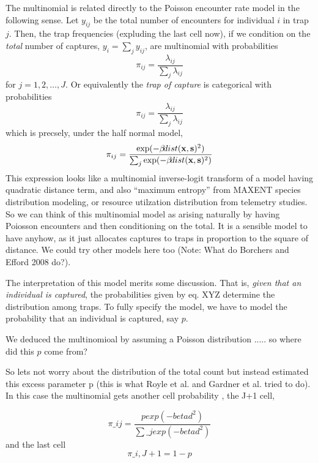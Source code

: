{The multinomial is related
directly to the Poisson encounter rate model in the 
following sense. Let $y_{ij}$ be the total number of encounters for
individual $i$ in trap $j$. Then, 
the trap frequencies (expluding the
last cell now),
if we condition on the {\it total}
number of captures, $y_{i} = \sum_{j} y_{ij}$, 
are multinomial with probabilities 
\[
 \pi_{ij} =  \frac{ \lambda_{ij} } { \sum_{j} \lambda_{ij} } 
\]
for $j=1,2,\ldots,J$.
Or equivalently the {\it trap of
  capture} is categorical with probabilities
\[
 \pi_{ij} =  \frac{ \lambda_{ij} } { \sum_{j} \lambda_{ij} } 
\]
which is precsely, under the half normal model, 
\[
 \pi_{ij} =  \frac{ \exp( - \beta \! dist({\bf x},{\bf s})^2 ) }  {
   \sum_{j} \exp(-\beta \! dist({\bf x},{\bf s})^2)}
\]
This expression looks like a multinomial inverse-logit transform of a model having
quadratic distance term, and also ``maximum entropy'' from MAXENT
species distribution modeling, or resource utilzation distribution
from telemetry studies.
So we can think of this multinomial model as arising naturally 
by having Poiosson encounters and then conditioning on the total. 
It is a sensible model to have anyhow, as it just allocates captures
to traps in proportion to the square of distance.  We could try other
models here too (Note: What do Borchers and Efford 2008 do?).


The interpretation of this model merits some discussion. That is, 
{\it given that an individual is captured}, the probabilities given by
eq. XYZ determine 
the distribution among traps. To fully specify the model, we have to
model the probability that an individual is captured, say $p$.

We deduced the multinomioal by assuming a Poisson distribution
..... so
where did this $p$ come from?

So lets not worry about the distribution of the total count
but instead estimated this excess parameter p (this is what Royle et al.
and Gardner et al. tried to do).  In this case the multinomial gets
another cell probability , the J+1 cell, 

\[
 \pi\_{ij} =  \frac{ p exp( - beta d^2 ) }  { \sum\_{j} exp(-beta d^2)}
\]
and the last cell
\[
 \pi\_{i,J+1} =  1-p 
\]


}
